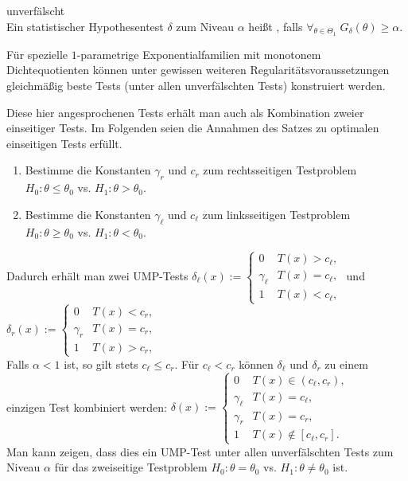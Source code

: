 \begin{Def}{unverfälscht}\\
    Ein statistischer Hypothesentest $\delta$ zum Niveau $\alpha$ heißt ,
    falls $\forall_{\theta \in \Theta_1}\; G_\delta(\theta) \ge \alpha$.
\end{Def}

\linie
\pagebreak

\begin{Bem}
    Für spezielle $1$-parametrige Exponentialfamilien mit monotonem Dichtequotienten können
    unter gewissen weiteren Regularitätsvoraussetzungen gleichmäßig beste Tests
    (unter allen unverfälschten Tests) konstruiert werden.


    Diese hier angesprochenen Tests erhält man auch als Kombination zweier einseitiger Tests.
    Im Folgenden seien die Annahmen des Satzes zu optimalen einseitigen Tests erfüllt.
    \begin{enumerate}[label=\arabic*.]
        \item
        Bestimme die Konstanten $\gamma_r$ und $c_r$ zum rechtsseitigen Testproblem\\
        $H_0\colon \theta \le \theta_0$ vs.
        $H_1\colon \theta > \theta_0$.

        \item
        Bestimme die Konstanten $\gamma_\ell$ und $c_\ell$ zum linksseitigen Testproblem\\
        $H_0\colon \theta \ge \theta_0$ vs.
        $H_1\colon \theta < \theta_0$.
    \end{enumerate}
    Dadurch erhält man zwei UMP-Tests
    $\delta_\ell(x) :=  \begin{cases}0 & T(x) > c_\ell,\\
    \gamma_\ell & T(x) = c_\ell,\\1 & T(x) < c_\ell,\end{cases}$
    und
    $\delta_r(x) :=  \begin{cases}0 & T(x) < c_r,\\
    \gamma_r & T(x) = c_r,\\1 & T(x) > c_r,\end{cases}$\\
    Falls $\alpha < 1$ ist, so gilt stets $c_\ell \le c_r$.
    Für $c_\ell < c_r$ können $\delta_\ell$ und $\delta_r$ zu einem einzigen Test kombiniert
    werden:
    $\delta(x) :=  \begin{cases}0 & T(x) \in (c_\ell, c_r),\\
    \gamma_\ell & T(x) = c_\ell,\\\gamma_r & T(x) = c_r,\\
    1 & T(x) \notin [c_\ell, c_r].\end{cases}$\\
    Man kann zeigen, dass dies ein UMP-Test unter allen unverfälschten Tests zum Niveau $\alpha$
    für das zweiseitige Testproblem $H_0\colon \theta = \theta_0$ vs.
    $H_1\colon \theta \not= \theta_0$ ist.
\end{Bem}

